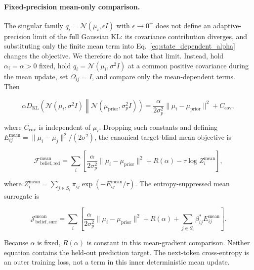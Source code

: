 \documentclass[twoside,11pt]{article}
\begin{document}
\paragraph{Fixed-precision mean-only comparison.}

The singular family $q_i=\mathcal{N}(\mu_i,\epsilon I)$ with $\epsilon\to0^+$ does not define an adaptive-precision limit of the full Gaussian KL: its covariance contribution diverges, and substituting only the finite mean term into Eq.~\eqref{eq:state_dependent_alpha} changes the objective. We therefore do not take that limit. Instead, hold $\alpha_i=\alpha>0$ fixed, hold $q_i=\mathcal{N}(\mu_i,\sigma^2I)$ at a common positive covariance during the mean update, set $\Omega_{ij}=I$, and compare only the mean-dependent terms. Then

\begin{equation}
\alpha D_{\mathrm{KL}}
\left(
\mathcal{N}(\mu_i,\sigma^2I)
\middle\|
\mathcal{N}(\mu_{\mathrm{prior}},\sigma_p^2I)
\right)
=\frac{\alpha}{2\sigma_p^2}
\|\mu_i-\mu_{\mathrm{prior}}\|^2+C_{\mathrm{cov}},
\label{eq:alpha_i_deterministic}
\end{equation}

where $C_{\mathrm{cov}}$ is independent of $\mu_i$. Dropping such constants and defining $E_{ij}^{\mathrm{mean}}=\|\mu_i-\mu_j\|^2/(2\sigma^2)$, the canonical target-blind mean objective is

\begin{equation}
\mathcal{F}_{\mathrm{belief,red}}^{\mathrm{mean}}
=\sum_i\left[
\frac{\alpha}{2\sigma_p^2}\|\mu_i-\mu_{\mathrm{prior}}\|^2
+R(\alpha)-\tau\log Z_i^{\mathrm{mean}}
\right],
\label{eq:deterministic_free_energy_adaptive}
\end{equation}

where $Z_i^{\mathrm{mean}}=\sum_{j\in S_i}\pi_{ij}\exp(-E_{ij}^{\mathrm{mean}}/\tau)$. The entropy-suppressed mean surrogate is

\begin{equation}
\mathcal{J}_{\mathrm{belief,surr}}^{\mathrm{mean}}
=\sum_i\left[
\frac{\alpha}{2\sigma_p^2}\|\mu_i-\mu_{\mathrm{prior}}\|^2
+R(\alpha)
+\sum_{j\in S_i}\beta_{ij}^*E_{ij}^{\mathrm{mean}}
\right].
\label{eq:deterministic_free_energy_standard}
\end{equation}

Because $\alpha$ is fixed, $R(\alpha)$ is constant in this mean-gradient comparison. Neither equation contains the held-out prediction target. The next-token cross-entropy is an outer training loss, not a term in this inner deterministic mean update.
\end{document}
